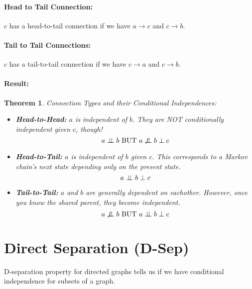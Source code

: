 \documentclass[a4paper,12pt]{report}
\newtheorem{theorem}{Theorem}
\begin{document}
\paragraph{Head to Tail Connection: } $c$ has a head-to-tail connection if we have $a\to c$ and $c\to b$. 

\paragraph{Tail to Tail Connections: } $c$ has a tail-to-tail connection if we have $c\to a$ and $c \to b$.

\paragraph{Result: } \begin{theorem}{Connection Types and their Conditional Independences: }
\begin{itemize}
\item \textbf{Head-to-Head:} $a$ is independent of $b$. They are NOT conditionally independent given $c$, though!
\begin{equation}
a \perp\!\!\!\perp b \text{ BUT } a \not\perp\!\!\!\perp b \perp c
\end{equation}

\item \textbf{Head-to-Tail:} $a$ is independent of $b$ given $c$. This corresponds to a Markov chain's next state depending only on the present state. 
\begin{equation}
a \perp\!\!\!\perp b \perp c
\end{equation}

\item \textbf{Tail-to-Tail:} $a$ and $b$ are generally dependent on eachother. However, once you know the shared parent, they become \textit{independent}.
\begin{equation}
a \not \perp\!\!\!\perp b \text{ BUT } a \perp\!\!\!\perp b \perp c
\end{equation}
\end{itemize}
\end{theorem}



\section{Direct Separation (D-Sep)}

D-separation property for directed graphs tells us if we have conditional independence for subsets of a graph.
\end{document}
